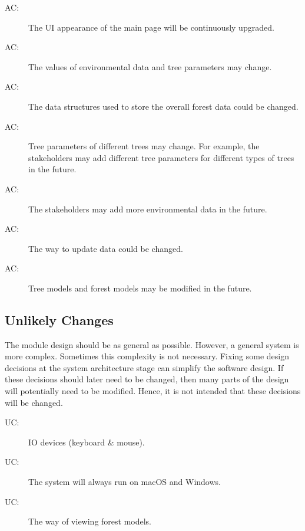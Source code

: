 \documentclass[12pt, titlepage]{article}
\newcounter{acnum}
\newcommand{\actheacnum}{AC\theacnum}
\newcounter{ucnum}
\newcommand{\uctheucnum}{UC\theucnum}
\begin{document}
\begin{description}
\item[ \actheacnum \label{acMainUI}:] The UI appearance of the main page
 will be continuously upgraded.
 
\item[ \actheacnum \label{acDataValue}:] The values of
environmental data and tree parameters may change.

\item[ \actheacnum \label{acDataStructure}:] The data structures used to store the overall forest data could be changed.

\item[ \actheacnum \label{acTreeParam}:] Tree parameters of different
trees may change. For example, the stakeholders may add different tree parameters for 
different types of trees in the future.

\item[ \actheacnum \label{acEnvData}:] The stakeholders may add more
environmental data in the future.

\item[ \actheacnum \label{acUpdateData}:] The way to update data could be changed.

\item[ \actheacnum \label{acDataModified}:] Tree models and forest models may be modified in the future.

\end{description}

\subsection{Unlikely Changes} \label{SecUchange}

The module design should be as general as possible. However, a general system is
more complex. Sometimes this complexity is not necessary. Fixing some design
decisions at the system architecture stage can simplify the software design. If
these decisions should later need to be changed, then many parts of the design
will potentially need to be modified. Hence, it is not intended that these
decisions will be changed.

\begin{description}
\item[ \uctheucnum \label{ucIO}:]  IO devices (keyboard \& mouse). 
\item[ \uctheucnum \label{ucOS}:] The system will always run on 
macOS and Windows. 
\item[ \uctheucnum \label{ucMove}:] The way of viewing forest models.
\end{description}
\end{document}

